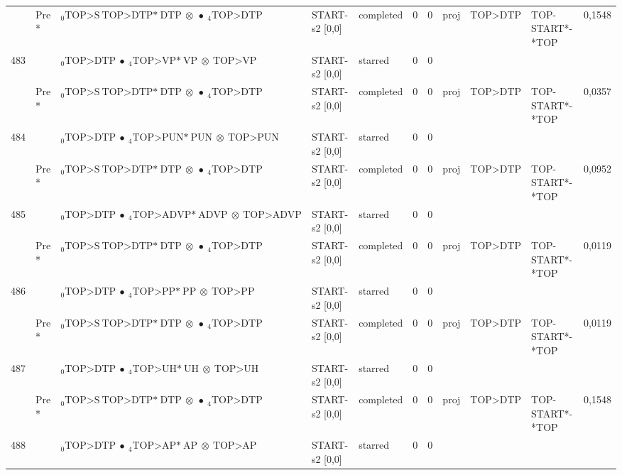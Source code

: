 \documentclass[10pt]{article}
\begin{document}
\begin{longtable}[htbp]{lllllllllll}
 & Pre *& $ {}_0 \textrm{TOP>S} \ \textrm{TOP>DTP*} \ \textrm{DTP} \  \otimes \  \bullet \ {}_{4} \textrm{TOP>DTP} $ & START-s2 [0,0] & completed & 0 & 0 & proj & TOP>DTP & TOP-START*-*TOP & 0,1548 \\ 
483 & & $ {}_0 \textrm{TOP>DTP} \  \bullet \ {}_{4} \textrm{TOP>VP*} \ \textrm{VP} \  \otimes \ \textrm{TOP>VP} $ & START-s2 [0,0] & starred & 0 & 0 & & & & \\ 
 & Pre *& $ {}_0 \textrm{TOP>S} \ \textrm{TOP>DTP*} \ \textrm{DTP} \  \otimes \  \bullet \ {}_{4} \textrm{TOP>DTP} $ & START-s2 [0,0] & completed & 0 & 0 & proj & TOP>DTP & TOP-START*-*TOP & 0,0357 \\ 
484 & & $ {}_0 \textrm{TOP>DTP} \  \bullet \ {}_{4} \textrm{TOP>PUN*} \ \textrm{PUN} \  \otimes \ \textrm{TOP>PUN} $ & START-s2 [0,0] & starred & 0 & 0 & & & & \\ 
 & Pre *& $ {}_0 \textrm{TOP>S} \ \textrm{TOP>DTP*} \ \textrm{DTP} \  \otimes \  \bullet \ {}_{4} \textrm{TOP>DTP} $ & START-s2 [0,0] & completed & 0 & 0 & proj & TOP>DTP & TOP-START*-*TOP & 0,0952 \\ 
485 & & $ {}_0 \textrm{TOP>DTP} \  \bullet \ {}_{4} \textrm{TOP>ADVP*} \ \textrm{ADVP} \  \otimes \ \textrm{TOP>ADVP} $ & START-s2 [0,0] & starred & 0 & 0 & & & & \\ 
 & Pre *& $ {}_0 \textrm{TOP>S} \ \textrm{TOP>DTP*} \ \textrm{DTP} \  \otimes \  \bullet \ {}_{4} \textrm{TOP>DTP} $ & START-s2 [0,0] & completed & 0 & 0 & proj & TOP>DTP & TOP-START*-*TOP & 0,0119 \\ 
486 & & $ {}_0 \textrm{TOP>DTP} \  \bullet \ {}_{4} \textrm{TOP>PP*} \ \textrm{PP} \  \otimes \ \textrm{TOP>PP} $ & START-s2 [0,0] & starred & 0 & 0 & & & & \\ 
 & Pre *& $ {}_0 \textrm{TOP>S} \ \textrm{TOP>DTP*} \ \textrm{DTP} \  \otimes \  \bullet \ {}_{4} \textrm{TOP>DTP} $ & START-s2 [0,0] & completed & 0 & 0 & proj & TOP>DTP & TOP-START*-*TOP & 0,0119 \\ 
487 & & $ {}_0 \textrm{TOP>DTP} \  \bullet \ {}_{4} \textrm{TOP>UH*} \ \textrm{UH} \  \otimes \ \textrm{TOP>UH} $ & START-s2 [0,0] & starred & 0 & 0 & & & & \\ 
 & Pre *& $ {}_0 \textrm{TOP>S} \ \textrm{TOP>DTP*} \ \textrm{DTP} \  \otimes \  \bullet \ {}_{4} \textrm{TOP>DTP} $ & START-s2 [0,0] & completed & 0 & 0 & proj & TOP>DTP & TOP-START*-*TOP & 0,1548 \\ 
488 & & $ {}_0 \textrm{TOP>DTP} \  \bullet \ {}_{4} \textrm{TOP>AP*} \ \textrm{AP} \  \otimes \ \textrm{TOP>AP} $ & START-s2 [0,0] & starred & 0 & 0 & & & & \\ 

\end{longtable}
\end{document}
